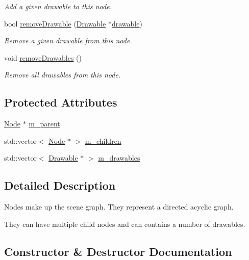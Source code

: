 \begin{DoxyCompactItemize}
\begin{DoxyCompactList}\small\item\em Add a given drawable to this node. \end{DoxyCompactList}\item 
bool \mbox{\hyperlink{classec_1_1_node_a20231d84c538f7dea43836b3e44376a7}{remove\+Drawable}} (\mbox{\hyperlink{classec_1_1_drawable}{Drawable}} $\ast$\mbox{\hyperlink{_resource_type_8h_a0e08bf97f986b1083a00d3f004fb04f7}{drawable}})
\begin{DoxyCompactList}\small\item\em Remove a given drawable from this node. \end{DoxyCompactList}\item 
void \mbox{\hyperlink{classec_1_1_node_a57fd7f0d158527df372880399ca48002}{remove\+Drawables}} ()
\begin{DoxyCompactList}\small\item\em Remove all drawables from this node. \end{DoxyCompactList}\end{DoxyCompactItemize}
\subsection*{Protected Attributes}
\begin{DoxyCompactItemize}
\item 
\mbox{\hyperlink{classec_1_1_node}{Node}} $\ast$ \mbox{\hyperlink{classec_1_1_node_a9f5373bd3ba5bfed53894223adcfe791}{m\+\_\+parent}}
\item 
std\+::vector$<$ \mbox{\hyperlink{classec_1_1_node}{Node}} $\ast$ $>$ \mbox{\hyperlink{classec_1_1_node_a648e1758013c7fc5899cbff2f8fe41fa}{m\+\_\+children}}
\item 
std\+::vector$<$ \mbox{\hyperlink{classec_1_1_drawable}{Drawable}} $\ast$ $>$ \mbox{\hyperlink{classec_1_1_node_aa9f624971a4906674148117ba4442c01}{m\+\_\+drawables}}
\end{DoxyCompactItemize}


\subsection{Detailed Description}
Nodes make up the scene graph. They represent a directed acyclic graph. 

They can have multiple child nodes and can contains a number of drawables. 

\subsection{Constructor \& Destructor Documentation}
\mbox{\label{classec_1_1_node_a38582758606734f5f3a0e5c6d3dc0200}} 
